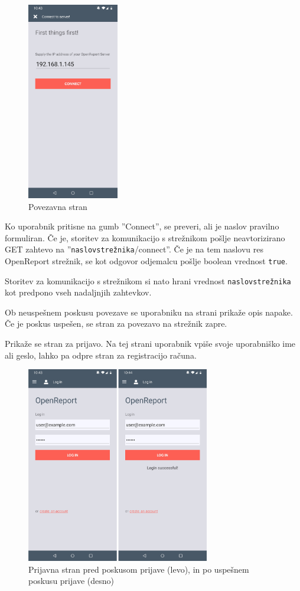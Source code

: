\documentclass[a4paper, 12pt]{book}
\begin{document}
\begin{figure}[H]
\begin{center}
\includegraphics[width=4cm]{app_connect}
\end{center}
\caption{Povezavna stran}
\label{app_connect}
\end{figure}

Ko uporabnik pritisne na gumb ''Connect'', se preveri, ali je naslov pravilno formuliran.
Če je, storitev za komunikacijo s strežnikom pošlje neavtorizirano GET zahtevo na ''\texttt{naslovstrežnika}/connect''. 
Če je na tem naslovu res OpenReport strežnik, se kot odgovor odjemalcu pošlje boolean vrednost \texttt{true}.

Storitev za komunikacijo s strežnikom si nato hrani vrednost \texttt{naslovstrežnika} kot predpono vseh nadaljnjih zahtevkov.

Ob neuspešnem poskusu povezave se uporabniku na strani prikaže opis napake.
Če je poskus uspešen, se stran za povezavo na strežnik zapre.

Prikaže se stran za prijavo.
Na tej strani uporabnik vpiše svoje uporabniško ime ali geslo, lahko pa odpre stran za registracijo računa.


\begin{figure}[H]
\begin{center}
\includegraphics[width=8cm]{app_login}
\end{center}
	\caption{Prijavna stran pred poskusom prijave (levo), in po uspešnem poskusu prijave (desno)}
\label{app_login}
\end{figure}
\end{document}
